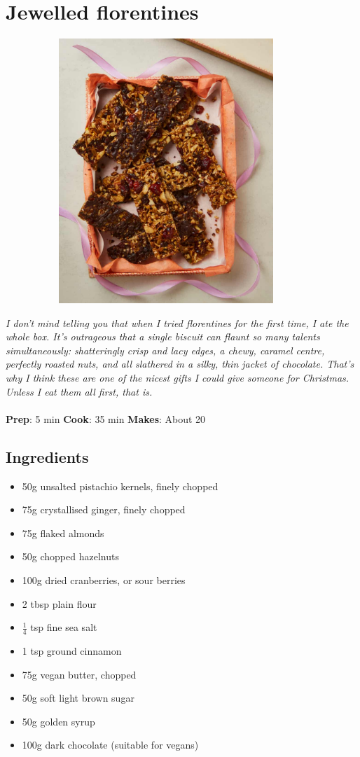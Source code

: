 \documentclass{book}
\begin{document}
\section{Jewelled florentines}
\begin{figure}
\centering\includegraphics[width=10cm,height=10cm,keepaspectratio]{Recipe_Pictures/Jewelled_florentines.png}
\end{figure}
\emph{I don’t mind telling you that when I tried florentines for the first time, I ate the whole box. It’s outrageous that a single biscuit can flaunt so many talents simultaneously: shatteringly crisp and lacy edges, a chewy, caramel centre, perfectly roasted nuts, and all slathered in a silky, thin jacket of chocolate. That’s why I think these are one of the nicest gifts I could give someone for Christmas. Unless I eat them all first, that is.}\\\\ 
\textbf{Prep}: 5 min
\textbf{Cook}: 35 min
\textbf{Makes}: About 20
\subsection*{Ingredients}
\begin{itemize}
\item 50g unsalted pistachio kernels, finely chopped
\item 75g crystallised ginger, finely chopped
\item 75g flaked almonds
\item 50g chopped hazelnuts
\item 100g dried cranberries, or sour berries
\item 2 tbsp plain flour
\item $\frac{1}{4}$ tsp fine sea salt
\item 1 tsp ground cinnamon
\item 75g vegan butter, chopped
\item 50g soft light brown sugar
\item 50g golden syrup
\item 100g dark chocolate (suitable for vegans)
\end{itemize}
\end{document}
